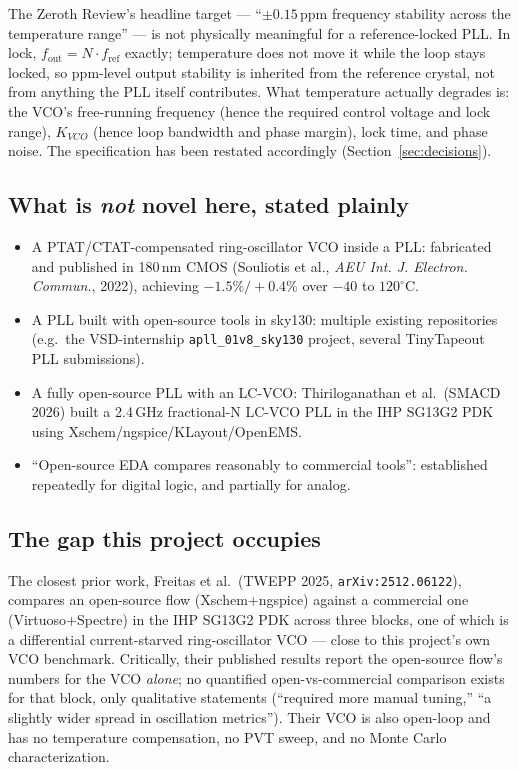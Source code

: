 \documentclass[11pt]{article}
\begin{document}
The Zeroth Review's headline target --- ``$\pm 0.15$\,ppm frequency stability across the temperature range'' --- is not physically meaningful for a reference-locked PLL. In lock, $f_{\text{out}} = N \cdot f_{\text{ref}}$ exactly; temperature does not move it while the loop stays locked, so ppm-level output stability is inherited from the reference crystal, not from anything the PLL itself contributes. What temperature actually degrades is: the VCO's free-running frequency (hence the required control voltage and lock range), $K_{VCO}$ (hence loop bandwidth and phase margin), lock time, and phase noise. The specification has been restated accordingly (Section~\ref{sec:decisions}).

\subsection{What is \emph{not} novel here, stated plainly}

\begin{itemize}[leftmargin=1.5em]
  \item A PTAT/CTAT-compensated ring-oscillator VCO inside a PLL: fabricated and published in 180\,nm CMOS (Souliotis et al., \emph{AEU Int. J. Electron. Commun.}, 2022), achieving $-1.5\%/+0.4\%$ over $-40$ to $120^\circ$C.
  \item A PLL built with open-source tools in sky130: multiple existing repositories (e.g.\ the VSD-internship \texttt{apll\_01v8\_sky130} project, several Tiny\-Tapeout PLL submissions).
  \item A fully open-source PLL with an LC-VCO: Thiriloganathan et al.\ (SMACD 2026) built a 2.4\,GHz fractional-N LC-VCO PLL in the IHP SG13G2 PDK using Xschem/ngspice/KLayout/OpenEMS.
  \item ``Open-source EDA compares reasonably to commercial tools'': established repeatedly for digital logic, and partially for analog.
\end{itemize}

\subsection{The gap this project occupies}

The closest prior work, Freitas et al.\ (TWEPP 2025, \texttt{arXiv:2512.06122}), compares an open-source flow (Xschem+ngspice) against a commercial one (Virtuoso+Spectre) in the IHP SG13G2 PDK across three blocks, one of which is a differential current-starved ring-oscillator VCO --- close to this project's own VCO benchmark. Critically, their published results report the open-source flow's numbers for the VCO \emph{alone}; no quantified open-vs-commercial comparison exists for that block, only qualitative statements (``required more manual tuning,'' ``a slightly wider spread in oscillation metrics''). Their VCO is also open-loop and has no temperature compensation, no PVT sweep, and no Monte Carlo characterization.
\end{document}
